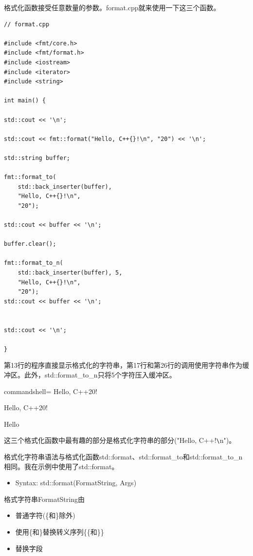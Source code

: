 格式化函数接受任意数量的参数。format.cpp就来使用一下这三个函数。

\begin{lstlisting}[style=styleCXX]
// format.cpp

#include <fmt/core.h>
#include <fmt/format.h>
#include <iostream>
#include <iterator>
#include <string>

int main() {

std::cout << '\n';

std::cout << fmt::format("Hello, C++{}!\n", "20") << '\n';

std::string buffer;

fmt::format_to(
	std::back_inserter(buffer),
	"Hello, C++{}!\n",
	"20");

std::cout << buffer << '\n';

buffer.clear();

fmt::format_to_n(
	std::back_inserter(buffer), 5,
	"Hello, C++{}!\n",
	"20");
std::cout << buffer << '\n';


std::cout << '\n';

}
\end{lstlisting}

第13行的程序直接显示格式化的字符串，第17行和第26行的调用使用字符串作为缓冲区。此外，std::format\_to\_n只将5个字符压入缓冲区。

\begin{tcblisting}{commandshell={}}
Hello, C++20!

Hello, C++20!

Hello
\end{tcblisting}

这三个格式化函数中最有趣的部分是格式化字符串的部分("Hello, C++{}!\verb|\|n")。


格式化字符串语法与格式化函数std::format、std::format\_to和std::format\_to\_n相同。我在示例中使用了std::format。

\begin{itemize}
\item 
Syntax: std::format(FormatString, Args)
\end{itemize}

格式字符串FormatString由

\begin{itemize}
\item 
普通字符(\{和\}除外)

\item 
使用\{和\}替换转义序列\{\{和\}\}

\item 
替换字段
\end{itemize}

